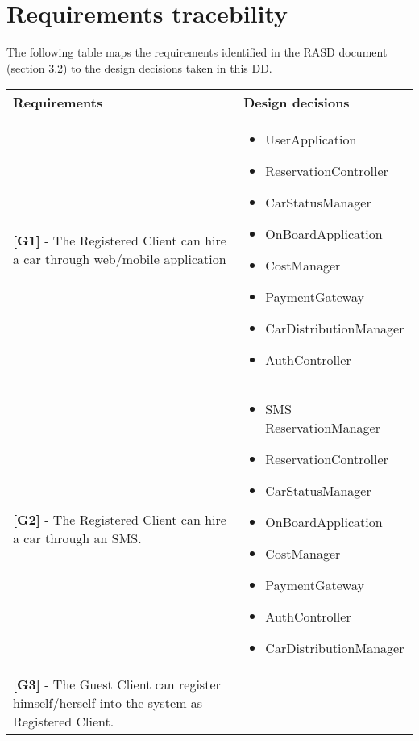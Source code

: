 \chapter{Requirements tracebility}
The following table maps the requirements identified in the RASD document (section 3.2) to the design decisions taken in this DD.
\begin{longtable}{|l|l|}
\hline
Requirements & Design decisions \\ \hline
\begin{minipage}[t]{0.5\textwidth}
\textbf{[G1]} - The Registered Client can hire a car through web/mobile application
\end{minipage} &
\begin{minipage}[t]{0.45\textwidth}
\begin{itemize}
\item UserApplication
\item ReservationController
\item CarStatusManager
\item OnBoardApplication
\item CostManager
\item PaymentGateway
\item CarDistributionManager
\item AuthController
\end{itemize}
\end{minipage} \\ \hline
\begin{minipage}[t]{0.5\textwidth}
\textbf{[G2]} - The Registered Client can hire a car through an SMS.
\end{minipage} &
\begin{minipage}[t]{0.45\textwidth}
\begin{itemize}
\item SMS ReservationManager
\item ReservationController
\item CarStatusManager
\item OnBoardApplication
\item CostManager
\item PaymentGateway
\item AuthController
\item CarDistributionManager
\end{itemize}
\end{minipage} \\ \hline
\begin{minipage}[t]{0.5\textwidth}
\textbf{[G3]} - The Guest Client can register himself/herself into the system as Registered Client.

\end{minipage}
\end{longtable}
